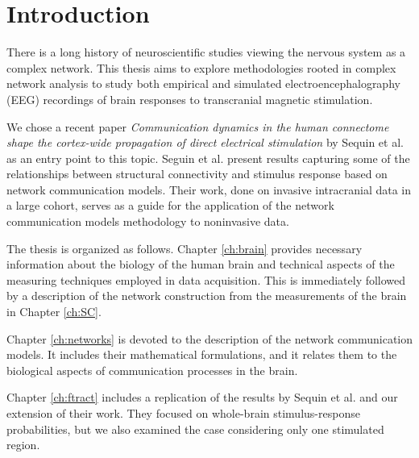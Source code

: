 \chapter*{Introduction}

There is a long history of neuroscientific studies viewing the nervous system as a complex network.\cite{sporns_structure_2013} This thesis aims to explore methodologies rooted in complex network analysis to study both empirical and simulated electroencephalography (EEG) recordings of brain responses to transcranial magnetic stimulation. 

We chose a recent paper \textit{Communication dynamics in the human connectome shape the cortex-wide propagation of direct electrical stimulation} by Sequin et al. \cite{seguin_communication_2023} as an entry point to this topic. Seguin et al. present results capturing some of the relationships between structural connectivity and stimulus response based on network communication models. Their work, done on invasive intracranial data in a large cohort, serves as a guide for the application of the network communication models methodology to noninvasive data.

The thesis is organized as follows. Chapter \ref{ch:brain} provides necessary information about the biology of the human brain and technical aspects of the measuring techniques employed in data acquisition. This is immediately followed by a description of the network construction from the measurements of the brain in Chapter \ref{ch:SC}.

Chapter \ref{ch:networks} is devoted to the description of the network communication models. It includes their mathematical formulations, and it relates them to the biological aspects of communication processes in the brain.

Chapter \ref{ch:ftract} includes a replication of the results by Sequin et al. and our extension of their work. They focused on whole-brain stimulus-response probabilities, but we also examined the case considering only one stimulated region. 

